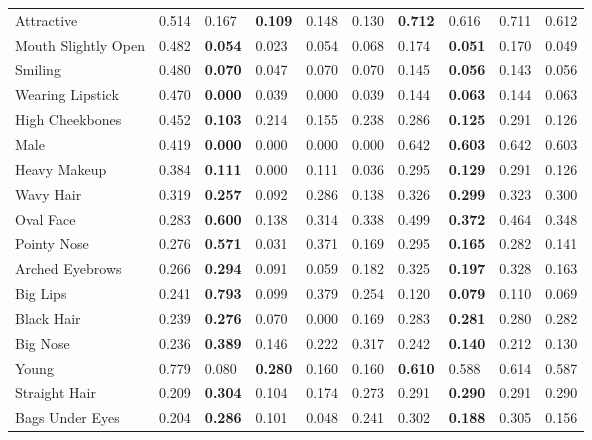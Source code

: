 \begin{tabular}{lrllrrllrr}
\hline
 Attractive          & 0.514 & 0.167     & \bf 0.109 & 0.148 & 0.130 & \bf 0.712 & 0.616     & 0.711 & 0.612 \\
 Mouth Slightly Open & 0.482 & \bf 0.054 & 0.023     & 0.054 & 0.068 & 0.174     & \bf 0.051 & 0.170 & 0.049 \\
 Smiling             & 0.480 & \bf 0.070 & 0.047     & 0.070 & 0.070 & 0.145     & \bf 0.056 & 0.143 & 0.056 \\
 Wearing Lipstick    & 0.470 & \bf 0.000 & 0.039     & 0.000 & 0.039 & 0.144     & \bf 0.063 & 0.144 & 0.063 \\
 High Cheekbones     & 0.452 & \bf 0.103 & 0.214     & 0.155 & 0.238 & 0.286     & \bf 0.125 & 0.291 & 0.126 \\
 Male                & 0.419 & \bf 0.000 & 0.000     & 0.000 & 0.000 & 0.642     & \bf 0.603 & 0.642 & 0.603 \\
 Heavy Makeup        & 0.384 & \bf 0.111 & 0.000     & 0.111 & 0.036 & 0.295     & \bf 0.129 & 0.291 & 0.126 \\
 Wavy Hair           & 0.319 & \bf 0.257 & 0.092     & 0.286 & 0.138 & 0.326     & \bf 0.299 & 0.323 & 0.300 \\
 Oval Face           & 0.283 & \bf 0.600 & 0.138     & 0.314 & 0.338 & 0.499     & \bf 0.372 & 0.464 & 0.348 \\
 Pointy Nose         & 0.276 & \bf 0.571 & 0.031     & 0.371 & 0.169 & 0.295     & \bf 0.165 & 0.282 & 0.141 \\
 Arched Eyebrows     & 0.266 & \bf 0.294 & 0.091     & 0.059 & 0.182 & 0.325     & \bf 0.197 & 0.328 & 0.163 \\
 Big Lips            & 0.241 & \bf 0.793 & 0.099     & 0.379 & 0.254 & 0.120     & \bf 0.079 & 0.110 & 0.069 \\
 Black Hair          & 0.239 & \bf 0.276 & 0.070     & 0.000 & 0.169 & 0.283     & \bf 0.281 & 0.280 & 0.282 \\
 Big Nose            & 0.236 & \bf 0.389 & 0.146     & 0.222 & 0.317 & 0.242     & \bf 0.140 & 0.212 & 0.130 \\
 Young               & 0.779 & 0.080     & \bf 0.280 & 0.160 & 0.160 & \bf 0.610 & 0.588     & 0.614 & 0.587 \\
 Straight Hair       & 0.209 & \bf 0.304 & 0.104     & 0.174 & 0.273 & 0.291     & \bf 0.290 & 0.291 & 0.290 \\
 Bags Under Eyes     & 0.204 & \bf 0.286 & 0.101     & 0.048 & 0.241 & 0.302     & \bf 0.188 & 0.305 & 0.156 \\

\end{tabular}

